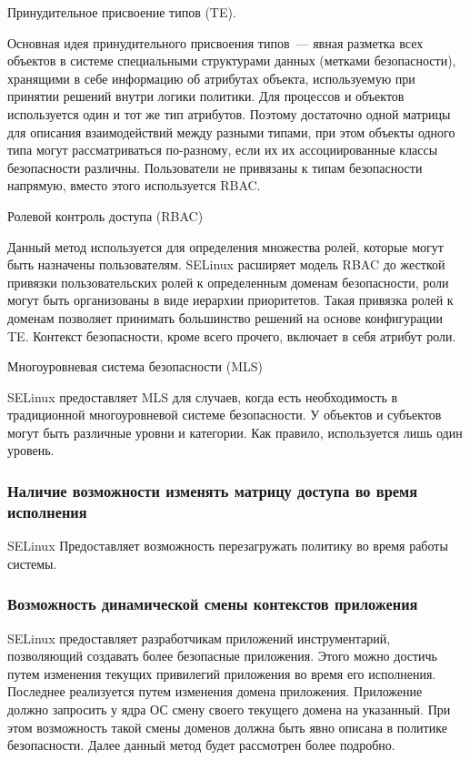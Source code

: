 Принудительное присвоение типов (TE). 

Основная идея принудительного присвоения
типов~--- явная разметка всех объектов 
в системе специальными структурами данных 
(метками безопасности), хранящими в себе информацию
об атрибутах объекта, используемую при принятии 
решений внутри логики политики. 
Для процессов и объектов используется 
один и тот же тип атрибутов. Поэтому достаточно 
одной матрицы для описания взаимодействий между 
разными типами, при этом объекты одного типа могут 
рассматриваться по-разному, если их их ассоциированные 
классы безопасности различны. Пользователи не 
привязаны к типам безопасности напрямую, вместо 
этого используется RBAC.

\bigskip
Ролевой контроль доступа (RBAC) 

Данный метод используется для определения 
множества ролей, которые могут 
быть назначены пользователям. SELinux расширяет 
модель RBAC до жесткой привязки пользовательских 
ролей к определенным доменам безопасности, роли 
могут быть организованы в виде иерархии приоритетов. 
Такая привязка ролей к доменам позволяет принимать 
большинство решений на основе конфигурации TE. 
Контекст безопасности, кроме всего прочего, включает 
в себя атрибут роли.

\bigskip
Многоуровневая система безопасности (MLS) 

SELinux предоставляет MLS для случаев, когда есть 
необходимость в традиционной многоуровневой системе 
безопасности. У объектов и субъектов могут быть 
различные уровни и категории. 
Как правило, используется лишь один уровень. 


\subsubsection{Наличие возможности изменять матрицу доступа 
	во время исполнения} 

SELinux Предоставляет возможность перезагружать 
	политику во время работы системы. 

\subsubsection{Возможность динамической смены контекстов
приложения} 
 
SELinux предоставляет разработчикам приложений 
инструментарий, позволяющий создавать более 
безопасные приложения. Этого можно достичь 
путем изменения текущих привилегий приложения 
во время его исполнения. 
Последнее реализуется путем изменения домена приложения. 
Приложение должно запросить у ядра ОС смену своего 
текущего домена на указанный. При этом возможность
такой смены доменов должна быть явно описана в 
политике безопасности. Далее данный метод будет
рассмотрен более подробно.  

